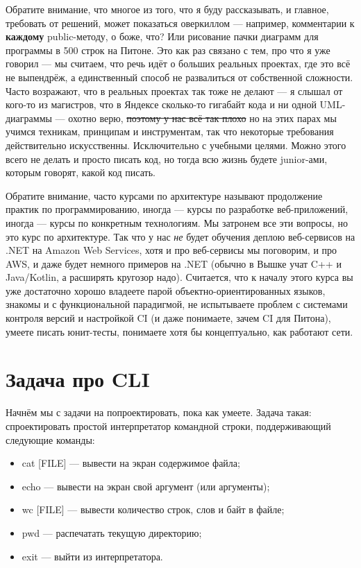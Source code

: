 \documentclass[a5paper]{article}
\begin{document}
Обратите внимание, что многое из того, что я буду рассказывать, и главное, требовать от решений, может показаться оверкиллом --- например, комментарии к \textbf{каждому} public-методу, о боже, что? Или рисование пачки диаграмм для программы в 500 строк на Питоне. Это как раз связано с тем, про что я уже говорил --- мы считаем, что речь идёт о больших реальных проектах, где это всё не выпендрёж, а единственный способ не развалиться от собственной сложности. Часто возражают, что в реальных проектах так тоже не делают --- я слышал от кого-то из магистров, что в Яндексе сколько-то гигабайт кода и ни одной UML-диаграммы --- охотно верю, \sout{поэтому у нас всё так плохо} но на этих парах мы учимся техникам, принципам и инструментам, так что некоторые требования действительно искусственны. Исключительно с учебными целями. Можно этого всего не делать и просто писать код, но тогда всю жизнь будете junior-ами, которым говорят, какой код писать.

Обратите внимание, часто курсами по архитектуре называют продолжение практик по программированию, иногда --- курсы по разработке веб-приложений, иногда --- курсы по конкретным технологиям. Мы затронем все эти вопросы, но это курс по архитектуре. Так что у нас \emph{не} будет обучения деплою веб-сервисов на .NET на Amazon Web Services, хотя и про веб-сервисы мы поговорим, и про AWS, и даже будет немного примеров на .NET (обычно в Вышке учат C++ и Java/Kotlin, а расширять кругозор надо). Считается, что к началу этого курса вы уже достаточно хорошо владеете парой объектно-ориентированных языков, знакомы и с функциональной парадигмой, не испытываете проблем с системами контроля версий и настройкой CI (и даже понимаете, зачем CI для Питона), умеете писать юнит-тесты, понимаете хотя бы концептуально, как работают сети.

\section{Задача про CLI}

Начнём мы с задачи на попроектировать, пока как умеете. Задача такая: спроектировать простой интерпретатор командной строки, поддерживающий следующие команды:

\begin{itemize}
    \item cat [FILE] --- вывести на экран содержимое файла;
    \item echo --- вывести на экран свой аргумент (или аргументы);
    \item wc [FILE] --- вывести количество строк, слов и байт в файле;
    \item pwd --- распечатать текущую директорию;
    \item exit --- выйти из интерпретатора.
\end{itemize}
\end{document}
